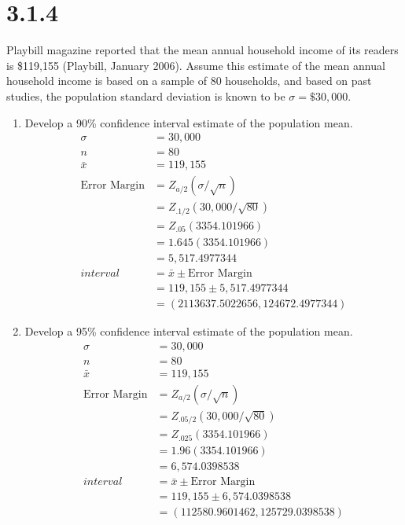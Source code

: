 \documentclass{article}
\begin{document}
\section*{3.1.4}
Playbill magazine reported that the mean annual household income of its readers is \$119,155 (Playbill, January 2006). Assume this estimate of the mean annual household income is based on a sample of 80 households, and based on past studies, the population standard deviation is known to be $\sigma = \$30,000$.
\begin{enumerate}
  \item Develop a 90\% confidence interval estimate of the population mean.
  \begin{align*}
    \sigma &= 30,000\\
    n &= 80\\
    \bar{x} &= 119,155\\
    \text{Error Margin} &= Z_{a/2}(\sigma / \sqrt{n})\\
    &=Z_{.1/2}(30,000/ \sqrt{80})\\
    &=Z_{.05}(3354.101966)\\
    &=1.645(3354.101966)\\
    &=5,517.4977344\\
    interval &= \bar{x} \pm \text{Error Margin}\\
    &= 119,155 \pm 5,517.4977344\\
    &= (2113637.5022656, 124672.4977344)
  \end{align*}

  \item Develop a 95\% confidence interval estimate of the population mean.
  \begin{align*}
    \sigma &= 30,000\\
    n &= 80\\
    \bar{x} &= 119,155\\
    \text{Error Margin} &= Z_{a/2}(\sigma / \sqrt{n})\\
    &=Z_{.05/2}(30,000/ \sqrt{80})\\
    &=Z_{.025}(3354.101966)\\
    &=1.96(3354.101966)\\
    &=6,574.0398538\\
    interval &= \bar{x} \pm \text{Error Margin}\\
    &= 119,155 \pm 6,574.0398538\\
    &= (112580.9601462, 125729.0398538
    )
  \end{align*}


\end{enumerate}
\end{document}
